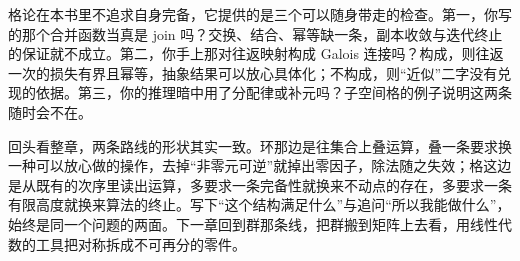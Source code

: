 格论在本书里不追求自身完备，它提供的是三个可以随身带走的检查。第一，你写的那个合并函数当真是 join 吗？交换、结合、幂等缺一条，副本收敛与迭代终止的保证就不成立。第二，你手上那对往返映射构成 Galois 连接吗？构成，则往返一次的损失有界且幂等，抽象结果可以放心具体化；不构成，则``近似''二字没有兑现的依据。第三，你的推理暗中用了分配律或补元吗？子空间格的例子说明这两条随时会不在。

回头看整章，两条路线的形状其实一致。环那边是往集合上叠运算，叠一条要求换一种可以放心做的操作，去掉``非零元可逆''就掉出零因子，除法随之失效；格这边是从既有的次序里读出运算，多要求一条完备性就换来不动点的存在，多要求一条有限高度就换来算法的终止。写下``这个结构满足什么''与追问``所以我能做什么''，始终是同一个问题的两面。下一章回到群那条线，把群搬到矩阵上去看，用线性代数的工具把对称拆成不可再分的零件。
